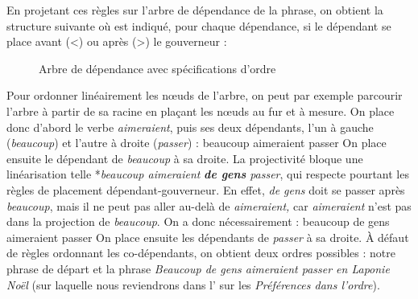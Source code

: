 En projetant ces règles sur l’arbre de dépendance de la phrase, on obtient la structure suivante où est indiqué, pour chaque dépendance, si le dépendant se place avant (<) ou après (>) le gouverneur :

\begin{figure}
\caption{Arbre de dépendance avec spécifications d’ordre\label{fig:}}
\end{figure}

Pour ordonner linéairement les nœuds de l’arbre, on peut par exemple parcourir l’arbre à partir de sa racine en plaçant les nœuds au fur et à mesure. On place donc d’abord le verbe \textit{aimeraient}, puis ses deux dépendants, l’un à gauche (\textit{beaucoup}) et l’autre à droite (\textit{passer}) :
\ea
    {beaucoup aimeraient passer}
\z
On place ensuite le dépendant de \textit{beaucoup} à sa droite. La projectivité bloque une linéarisation telle *\textit{beaucoup aimeraient} \textbf{\textit{de gens}} \textit{passer}, qui respecte pourtant les règles de placement dépendant-gouverneur. En effet, \textit{de gens} doit se passer après \textit{beaucoup}, mais il ne peut pas aller au-delà de \textit{aimeraient,} car \textit{aimeraient} n’est pas dans la projection de \textit{beaucoup}. On a donc nécessairement :
\ea
    {beaucoup de gens aimeraient passer}
\z
On place ensuite les dépendants de \textit{passer} à sa droite. À défaut de règles ordonnant les co-dépendants, on obtient deux ordres possibles : notre phrase de départ et la phrase \textit{Beaucoup de gens aimeraient passer en Laponie Noël} (sur laquelle nous reviendrons dans l’ sur les \textit{Préférences dans l’ordre}).


